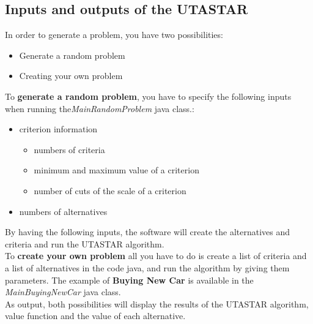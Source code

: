 \documentclass{report}
\begin{document}
\subsection{Inputs and outputs of the UTASTAR}
In order to generate a problem, you have two possibilities:
\begin{itemize}
\item Generate a random problem
\item Creating your own problem
\end{itemize}
To \textbf{generate a random problem}, you have to specify the following inputs when running the\textit{MainRandomProblem} java class.:
\begin{itemize}
\item criterion information
\begin{itemize}
\item numbers of criteria
\item minimum and maximum value of a criterion
\item number of cuts of the scale of a criterion
\end{itemize}
\item numbers of alternatives
\end{itemize}
By having the following inputs, the software will create the alternatives and criteria and run the UTASTAR algorithm.\\
To \textbf{create your own problem} all you have to do is create a list of criteria and a list of alternatives in the code java, and run the algorithm by giving them parameters. The example of \textbf{Buying New Car} is available in the \textit{MainBuyingNewCar} java class. \\

As output, both possibilities will display the results of the UTASTAR algorithm, value function and the value of each alternative.\\
\end{document}
